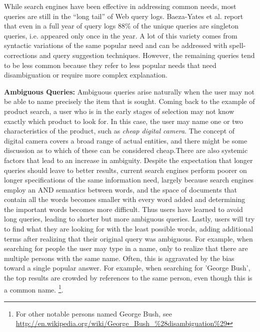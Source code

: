 While search engines have been effective in addressing common needs, most queries are still in the ``long tail'' of Web query logs. Baeza-Yates et al. report that even in a full year of query logs 88\% of the unique queries are singleton queries, i.e. appeared only once in the year. A lot of this variety comes from syntactic variations of the same popular need and can be addressed with spell-corrections and query suggestion techniques. However, the remaining queries tend to be less common because they refer to less popular needs that need disambiguation or require more complex explanation.

	\textbf{Ambiguous Queries:} 
	Ambiguous queries arise naturally when the user may not be able to name precisely the item that is sought. Coming back to the example of product search, a user who is in the early stages of selection may not know exactly which product to look for. In this case, the user may name one or two characteristics of the product, such as \emph{cheap digital camera}. The concept of digital camera covers a broad range of actual entities, and there might be some discussion as to which of these can be considered cheap.There are also systemic factors that lead to an increase in ambiguity. Despite the expectation that longer queries should leave to better results, current search engines perform poorer on longer specifications of the same information need, largely because search engines employ an AND semantics between words, and the space of documents that contain all the words becomes smaller with every word added and determining the important words becomes more difficult. Thus users have learned to avoid long queries, leading to shorter but more ambiguous queries. Lastly, users will try to find what they are looking for with the least possible words, adding additional terms after realizing that their original query was ambiguous. For example, when searching for people the user may type in a name, only to realize that there are multiple persons with the same name. Often, this is aggravated by the bias toward a single popular answer. For example, when searching for 'George Bush', the top results are crowded by references to the same person, even though this is a common name. \footnote{For other notable persons named George Bush, see \url{http://en.wikipedia.org/wiki/George_Bush_\%28disambiguation\%29}}.
			
